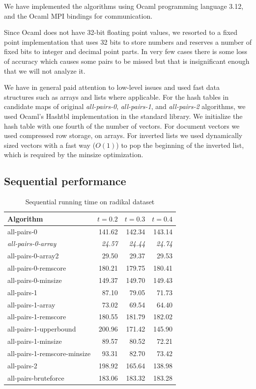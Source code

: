 \documentclass{comjnl}
\newcommand{\var}[1]{\mbox{\textsl{#1}}} %
\begin{document}
We have implemented the algorithms using Ocaml programming language
3.12, and the Ocaml MPI bindings for communication.

Since Ocaml does not have 32-bit floating point values, we resorted
to a fixed point implementation that uses 32 bits to store numbers and
reserves a number of fixed bits to integer and decimal point parts.
In very few cases there is some loss of accuracy which causes some
pairs to be missed but that is insignificant enough that we will not
analyze it.

We have in general paid attention to low-level issues and used fast
data structures such as arrays and lists where applicable.  For the
hash tables in candidate maps of original \var{all-pairs-0}, \var{all-pairs-1},
and \var{all-pairs-2} algorithms, we used Ocaml's Hashtbl implementation in
the standard library. We initialize the hash table with one fourth of
the number of vectors.  For document vectors we used compressed row
storage, on arrays. For inverted lists we used dynamically sized
vectors with a fast way ($O(1)$) to pop the beginning of the inverted
list, which is required by the minsize optimization.



\subsection{Sequential performance}
\label{sec:seqperf}

\begin{table}
  \centering
  \caption{Sequential running time on radikal dataset}
 \begin{tabular}{l r r r}
    Algorithm & $t=0.2$ & $t=0.3$ & $t=0.4$ \\ \hline
    all-pairs-0 &141.62 &142.34 &143.14\\ 
    \emph{all-pairs-0-array} & \emph{24.57} &\emph{24.44} &\emph{24.74}\\ 
    all-pairs-0-array2 & 29.50 &29.37& 29.53\\ 
    all-pairs-0-remscore& 180.21 &179.75& 180.41\\ 
    all-pairs-0-minsize& 149.37 &149.70 &149.43\\ 
    all-pairs-1& 87.10 & 79.05 &71.73\\ 
    all-pairs-1-array & 73.02 &69.54 & 64.40\\ 
    all-pairs-1-remscore& 180.55 & 181.79& 182.02\\ 
    all-pairs-1-upperbound &200.96 & 171.42 & 145.90\\ 
    all-pairs-1-minsize & 89.57 & 80.52 &72.21\\ 
    all-pairs-1-remscore-minsize & 93.31 & 82.70 & 73.42\\ 
    all-pairs-2& 198.92 & 165.64 & 138.98 \\
    all-pairs-bruteforce & 183.06 &183.32 &183.28 \\ \hline
  \end{tabular}
  \label{tab:radikalseqtime}
\end{table}
\end{document}
